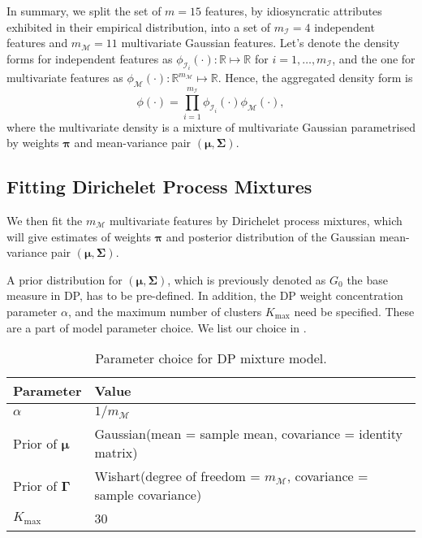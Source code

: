 In summary, we split the set of $m=15$ features, by idiosyncratic attributes exhibited in their empirical distribution, into a set of $m_\mathcal{I} = 4$ independent features and $m_\mathcal{M} = 11$ multivariate Gaussian features. Let's denote the density forms for independent features as $\phi_{\mathcal{I}_i} (\cdot) : \mathbb{R} \mapsto \mathbb{R}$ for $i = 1,\dots, m_\mathcal{I}$, and the one for multivariate features as $\phi_\mathcal{M} (\cdot) : \mathbb{R}^{m_\mathcal{M}} \mapsto \mathbb{R}$. Hence, the aggregated density form is
\begin{equation}
\phi(\cdot) = \prod_{i=1}^{m_\mathcal{I}} \phi_{\mathcal{I}_i} (\cdot) \phi_{\mathcal{M}}(\cdot),
\end{equation}
where the multivariate density is a mixture of multivariate Gaussian parametrised by weights $\bm\pi$ and mean-variance pair $(\bm\mu, \bm\Sigma)$.

\subsection{Fitting Dirichelet Process Mixtures}

We then fit the $m_\mathcal{M}$ multivariate features by Dirichelet process mixtures, which will give estimates of weights $\bm\pi$ and posterior distribution of the Gaussian mean-variance pair $(\bm\mu, \bm\Sigma)$.

A prior distribution for $(\bm\mu, \bm\Sigma)$, which is previously denoted as $G_0$ the base measure in DP, has to be pre-defined. In addition, the DP weight concentration parameter $\alpha$, and the maximum number of clusters $K_\text{max}$ need be specified. These are a part of model parameter choice. We list our choice in .

\begin{table}[!h]
\centering
\footnotesize
\begin{tabular}{l|l}
\hline
\textbf{Parameter} & \textbf{Value} \\
\hline
$\alpha$ &
$1/m_\mathcal{M}$ \\
Prior of $\bm\mu$ &
Gaussian(mean = sample mean, covariance = identity matrix) \\
Prior of $\bm\Gamma$ &
Wishart(degree of freedom = $m_\mathcal{M}$, covariance = sample covariance) \\
$K_\text{max}$ &
30 \\
\hline
\end{tabular}
\caption{Parameter choice for DP mixture model.}
\label{tab:DPFittingPrior}
\end{table}

